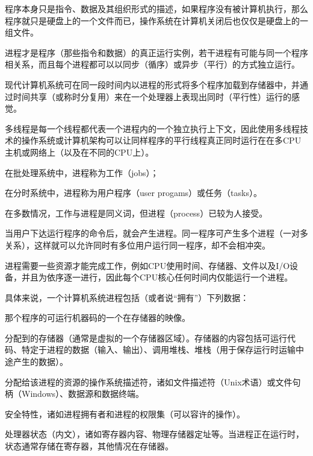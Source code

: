 程序本身只是指令、数据及其组织形式的描述，如果程序没有被计算机执行，那么程序就只是硬盘上的一个文件而已，操作系统在计算机关闭后也仅仅是硬盘上的一组文件。

进程才是程序（那些指令和数据）的真正运行实例，若干进程有可能与同一个程序相关系，而且每个进程都可以以同步（循序）或异步（平行）的方式独立运行。

现代计算机系统可在同一段时间内以进程的形式将多个程序加载到存储器中，并通过时间共享（或称时分复用）来在一个处理器上表现出同时（平行性）运行的感觉。

多线程是每一个线程都代表一个进程内的一个独立执行上下文，因此使用多线程技术的操作系统或计算机架构可以让同样程序的平行线程真正同时运行在在多CPU主机或网络上（以及在不同的CPU上）。

\begin{compactitem}
\item 在批处理系统中，进程称为工作（jobs）；
\item 在分时系统中，进程称为用户程序（user progams）或任务（tasks）。
\item 在多数情况，工作与进程是同义词，但进程（process）已较为人接受。
\end{compactitem}

当用户下达运行程序的命令后，就会产生进程。同一程序可产生多个进程（一对多关系），这样就可以允许同时有多位用户运行同一程序，却不会相冲突。

进程需要一些资源才能完成工作，例如CPU使用时间、存储器、文件以及I/O设备，并且为依序逐一进行，因此每个CPU核心任何时间内仅能运行一个进程。

具体来说，一个计算机系统进程包括（或者说“拥有”）下列数据：

\begin{compactitem}
\item 那个程序的可运行机器码的一个在存储器的映像。\
\item 分配到的存储器（通常是虚拟的一个存储器区域）。存储器的内容包括可运行代码、特定于进程的数据（输入、输出）、调用堆栈、堆栈（用于保存运行时运输中途产生的数据）。
\item 分配给该进程的资源的操作系统描述符，诸如文件描述符（Unix术语）或文件句柄（Windows）、数据源和数据终端。

\item 安全特性，诸如进程拥有者和进程的权限集（可以容许的操作）。

\item 处理器状态（内文），诸如寄存器内容、物理存储器定址等。当进程正在运行时，状态通常存储在寄存器，其他情况在存储器。
\end{compactitem}

